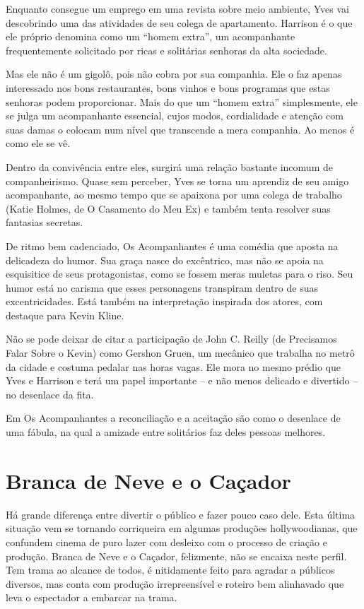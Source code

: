 \documentclass[a4paper,11pt,openright,openbib]{article}
\begin{document}
Enquanto consegue um emprego em uma revista sobre meio ambiente, Yves vai descobrindo uma das atividades de seu colega de apartamento. Harrison é o que ele próprio denomina como um “homem extra”, um acompanhante frequentemente solicitado por ricas e solitárias senhoras da alta sociedade.

Mas ele não é um gigolô, pois não cobra por sua companhia. Ele o faz apenas interessado nos bons restaurantes, bons vinhos e bons programas que estas senhoras podem proporcionar. Mais do que um “homem extra” simplesmente, ele se julga um acompanhante essencial, cujos modos, cordialidade e atenção com suas damas o colocam num nível que transcende a mera companhia. Ao menos é como ele se vê.

Dentro da convivência entre eles, surgirá uma relação bastante incomum de companheirismo. Quase sem perceber, Yves se torna um aprendiz de seu amigo acompanhante, ao mesmo tempo que se apaixona por uma colega de trabalho (Katie Holmes, de O Casamento do Meu Ex) e também tenta resolver suas fantasias secretas.

De ritmo bem cadenciado, Os Acompanhantes é uma comédia que aposta na delicadeza do humor. Sua graça nasce do excêntrico, mas não se apoia na esquisitice de seus protagonistas, como se fossem meras muletas para o riso. Seu humor está no carisma que esses personagens transpiram dentro de suas excentricidades. Está também na interpretação inspirada dos atores, com destaque para Kevin Kline.

Não se pode deixar de citar a participação de John C. Reilly (de Precisamos Falar Sobre o Kevin) como Gershon Gruen, um mecânico que trabalha no metrô da cidade e costuma pedalar nas horas vagas. Ele mora no mesmo prédio que Yves e Harrison e terá um papel importante – e não menos delicado e divertido – no desenlace da fita.

Em Os Acompanhantes a reconciliação e a aceitação são como o desenlace de uma fábula, na qual a amizade entre solitários faz deles pessoas melhores.

\section{Branca de Neve e o Caçador}
Há grande diferença entre divertir o público e fazer pouco caso dele. Esta última situação vem se tornando corriqueira em algumas produções hollywoodianas, que confundem cinema de puro lazer com desleixo com o processo de criação e produção. Branca de Neve e o Caçador, felizmente, não se encaixa neste perfil. Tem trama ao alcance de todos, é nitidamente feito para agradar a públicos diversos, mas conta com produção irrepreensível e roteiro bem alinhavado que leva o espectador a embarcar na trama.
\end{document}
